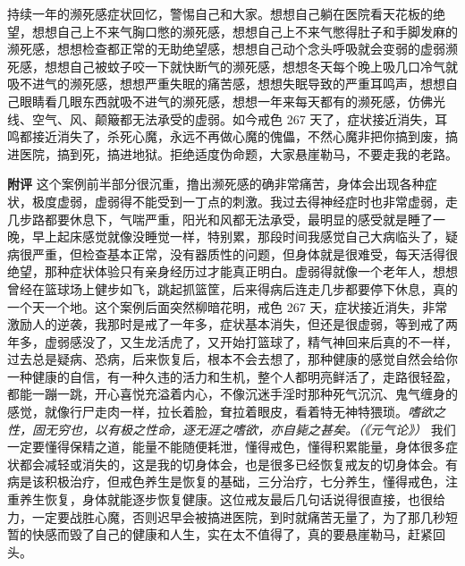 \begin{case}
    持续一年的濒死感症状回忆，警惕自己和大家。想想自己躺在医院看天花板的绝望，想想自己上不来气胸口憋的濒死感，想想自己上不来气憋得肚子和手脚发麻的濒死感，想想检查都正常的无助绝望感，想想自己动个念头呼吸就会变弱的虚弱濒死感，想想自己被蚊子咬一下就快断气的濒死感，想想冬天每个晚上吸几口冷气就吸不进气的濒死感，想想严重失眠的痛苦感，想想失眠导致的严重耳鸣声，想想自己眼睛看几眼东西就吸不进气的濒死感，想想一年来每天都有的濒死感，仿佛光线、空气、风、颠簸都无法承受的虚弱。如今戒色 267 天了，症状接近消失，耳鸣都接近消失了，杀死心魔，永远不再做心魔的傀儡，不然心魔非把你搞到废，搞进医院，搞到死，搞进地狱。拒绝适度伪命题，大家悬崖勒马，不要走我的老路。

    \textbf{附评} 这个案例前半部分很沉重，撸出濒死感的确非常痛苦，身体会出现各种症状，极度虚弱，虚弱得不能受到一丁点的刺激。我过去得神经症时也非常虚弱，走几步路都要休息下，气喘严重，阳光和风都无法承受，最明显的感受就是睡了一晚，早上起床感觉就像没睡觉一样，特别累，那段时间我感觉自己大病临头了，疑病很严重，但检查基本正常，没有器质性的问题，但身体就是很难受，每天活得很绝望，那种症状体验只有亲身经历过才能真正明白。虚弱得就像一个老年人，想想曾经在篮球场上健步如飞，跳起抓篮筐，后来得病后连走几步都要停下休息，真的一个天一个地。这个案例后面突然柳暗花明，戒色 267 天，症状接近消失，非常激励人的逆袭，我那时是戒了一年多，症状基本消失，但还是很虚弱，等到戒了两年多，虚弱感没了，又生龙活虎了，又开始打篮球了，精气神回来后真的不一样，过去总是疑病、恐病，后来恢复后，根本不会去想了，那种健康的感觉自然会给你一种健康的自信，有一种久违的活力和生机，整个人都明亮鲜活了，走路很轻盈，都能一蹦一跳，开心喜悦充溢着内心，不像沉迷手淫时那种死气沉沉、鬼气缠身的感觉，就像行尸走肉一样，拉长着脸，耷拉着眼皮，看着特无神特猥琐。\textit{嗜欲之性，固无穷也，以有极之性命，逐无涯之嗜欲，亦自毙之甚矣。（《元气论》）} 我们一定要懂得保精之道，能量不能随便耗泄，懂得戒色，懂得积累能量，身体很多症状都会减轻或消失的，这是我的切身体会，也是很多已经恢复戒友的切身体会。有病是该积极治疗，但戒色养生是恢复的基础，三分治疗，七分养生，懂得戒色，注重养生恢复，身体就能逐步恢复健康。这位戒友最后几句话说得很直接，也很给力，一定要战胜心魔，否则迟早会被搞进医院，到时就痛苦无量了，为了那几秒短暂的快感而毁了自己的健康和人生，实在太不值得了，真的要悬崖勒马，赶紧回头。
\end{case}

